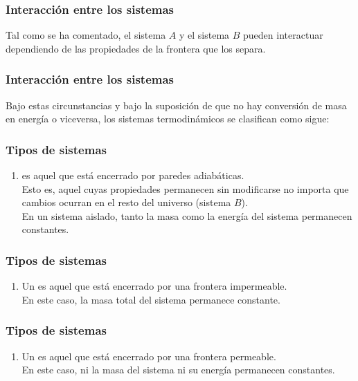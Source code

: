 \documentclass[12pt]{beamer}
\begin{document}
\begin{frame}
\frametitle{Interacción entre los sistemas}
Tal como se ha comentado, el sistema $A$ y el sistema $B$ pueden interactuar dependiendo de las propiedades de la frontera que los separa.
\end{frame}
\begin{frame}
\frametitle{Interacción entre los sistemas} Bajo estas circunstancias y bajo la suposición de que no hay conversión de masa en energía o viceversa, los sistemas termodinámicos se clasifican como sigue:
\end{frame}
\begin{frame}
\frametitle{Tipos de sistemas}
\begin{enumerate}[<+->]
\item {} es aquel que está encerrado por paredes adiabáticas.
\\[0.5em] \pause
Esto es, aquel cuyas propiedades permanecen sin modificarse no importa que cambios ocurran en el resto del universo (sistema $B$).
\\[0.5em] \pause
En un sistema aislado, tanto la masa como la energía del sistema permanecen constantes.
\seti
\end{enumerate}
\end{frame}
\begin{frame}
\frametitle{Tipos de sistemas}
\begin{enumerate}[<+->]
\conti
\item Un  es aquel que está encerrado por una frontera impermeable.
\\[0.5em] \pause
En este caso, la masa total del sistema permanece constante.
\seti
\end{enumerate}
\end{frame}
\begin{frame}
\frametitle{Tipos de sistemas}
\begin{enumerate}[<+->]
\conti
\item Un  es aquel que está encerrado por una frontera permeable.
\\[0.5em] \pause
En este caso, ni la masa del sistema ni su energía permanecen constantes.
\end{enumerate}
\end{frame}
\end{document}
